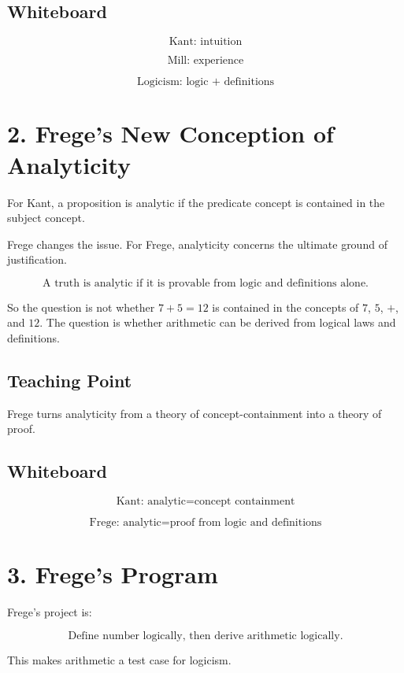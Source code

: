 \documentclass[11pt]{article}
\begin{document}
\subsection*{Whiteboard}

\[
\text{Kant: intuition}
\]

\[
\text{Mill: experience}
\]

\[
\text{Logicism: logic + definitions}
\]

\section*{2. Frege's New Conception of Analyticity}

For Kant, a proposition is analytic if the predicate concept is contained in the subject
concept.

Frege changes the issue. For Frege, analyticity concerns the ultimate ground of
justification.

\[
\boxed{
\text{A truth is analytic if it is provable from logic and definitions alone.}
}
\]

So the question is not whether \(7+5=12\) is contained in the concepts of \(7\), \(5\), \(+\),
and \(12\). The question is whether arithmetic can be derived from logical laws and
definitions.

\subsection*{Teaching Point}

Frege turns analyticity from a theory of concept-containment into a theory of proof.

\subsection*{Whiteboard}

\[
\text{Kant: analytic} = \text{concept containment}
\]

\[
\text{Frege: analytic} = \text{proof from logic and definitions}
\]

\section*{3. Frege's Program}

Frege's project is:

\[
\boxed{
\text{Define number logically, then derive arithmetic logically.}
}
\]

This makes arithmetic a test case for logicism.
\end{document}
